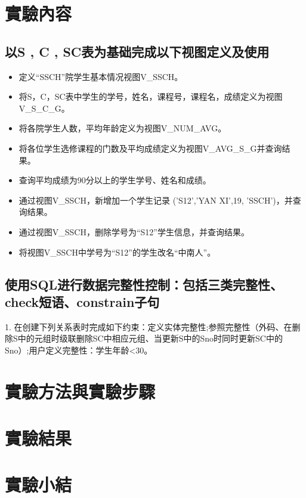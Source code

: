 \documentclass[12pt, a4paper]{report}
\begin{document}
\section{實驗內容}

\subsection{以S , C , SC表为基础完成以下视图定义及使用}

\begin{itemize}
    \item 定义“SSCH”院学生基本情况视图V\_SSCH。
    \item 将S，C，SC表中学生的学号，姓名，课程号，课程名，成绩定义为视图V\_S\_C\_G。
    \item 将各院学生人数，平均年龄定义为视图V\_NUM\_AVG。
    \item 将各位学生选修课程的门数及平均成绩定义为视图V\_AVG\_S\_G并查询结果。
    \item 查询平均成绩为90分以上的学生学号、姓名和成绩。
    \item 通过视图V\_SSCH，新增加一个学生记录 ('S12','YAN XI',19, 'SSCH')，并查询结果。
    \item 通过视图V\_SSCH，删除学号为“S12”学生信息，并查询结果。
    \item 将视图V\_SSCH中学号为“S12”的学生改名“中南人”。
\end{itemize}

\subsection{使用SQL进行数据完整性控制：包括三类完整性、check短语、constrain子句}

1. 在创建下列关系表时完成如下约束：定义实体完整性;参照完整性（外码、在删除S中的元组时级联删除SC中相应元组、当更新S中的Sno时同时更新SC中的Sno）;用户定义完整性：学生年龄<30。


\section{實驗方法與實驗步驟}

\section{實驗結果}

\section{實驗小結}
\end{document}
